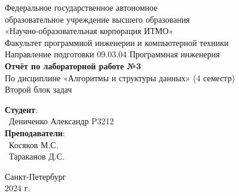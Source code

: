 \documentclass{article}
\begin{document}
\begin{center}
    \Large
    Федеральное государственное автономное \\
    образовательное учреждение высшего образования \\ 
    «Научно-образовательная корпорация ИТМО»\\
    \vspace{0.5cm}
    \large
    Факультет программной инженерии и компьютерной техники \\
    Направление подготовки 09.03.04 Программная инженерия \\
    \vspace{1cm}
    \Large
    \textbf{Отчёт по лабораторной работе №3} \\
    По дисциплине «Алгоритмы и структуры данных» (4 семестр)\\
    Второй блок задач\\
    \large
    \vspace{8cm}

    \begin{minipage}{.33\textwidth}
    \end{minipage}
    \hfill
    \begin{minipage}{.4\textwidth}
    
        \textbf{Студент}: \vspace{.1cm} \\
        \ Дениченко Александр P3212 \vspace{.1cm}\\
        \textbf{Преподаватели}:  \vspace{.1cm}\\
        \ Косяков М.С. \\
        \ Тараканов Д.С.
    \end{minipage}
    \vfill
Санкт-Петербург\\ 2024 г.
\end{center}

\newpage
\end{document}
